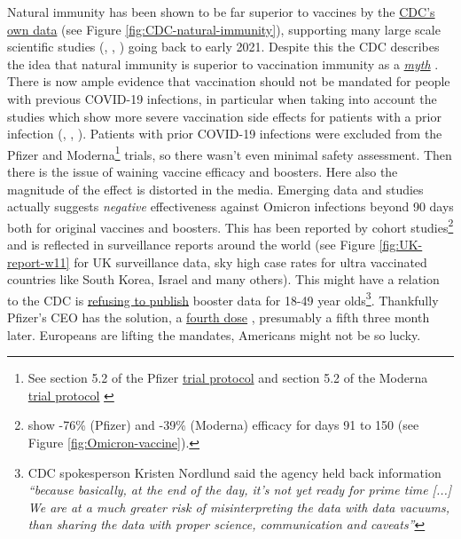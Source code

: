 \documentclass[11pt,a4paper,notitlepage]{report}
\begin{document}
Natural immunity has been shown to be far superior to vaccines by the \href{https://www.cdc.gov/mmwr/volumes/71/wr/mm7104e1.htm#F1_down}{CDC's own data} \cite{cdc28012020} (see Figure \ref{fig:CDC-natural-immunity}), supporting many large scale scientific studies (\cite{Gazit2021.08.24.21262415}, \cite{doi:10.1126/science.abf4063}, \cite{Goldberg2021.04.20.21255670}) going back to early 2021. Despite this the CDC describes the idea that natural immunity is superior to vaccination immunity as a \href{https://www.cdc.gov/coronavirus/2019-ncov/vaccines/facts.html}{\textit{myth}} \cite{cdc15122021} . There is now ample evidence that vaccination should not be mandated for people with previous COVID-19 infections, in particular when taking into account the studies which show more severe vaccination side effects for patients with a prior infection (\cite{Monforte2021}, \cite{LI20221082}, \cite{Raw22}). Patients with prior COVID-19 infections were excluded from the Pfizer and Moderna\footnote{See section 5.2 of the Pfizer \href{https://cdn.pfizer.com/pfizercom/2020-11/C4591001_Clinical_Protocol_Nov2020.pdf}{trial protocol} \cite{pfizer102020} and section 5.2 of the Moderna \href{https://www.modernatx.com/sites/default/files/mRNA-1273-P301-Protocol.pdf}{trial protocol} \cite{moderna102020}} trials, so there wasn't even minimal safety assessment. Then there is the issue of waining vaccine efficacy and boosters. Here also the magnitude of the effect is distorted in the media. Emerging data and studies actually suggests \textit{negative} effectiveness against Omicron infections beyond 90 days both for original vaccines and boosters. This has been reported by cohort studies\footnote{\citet{Hansen2021.12.20.21267966} show -76\% (Pfizer) and -39\% (Moderna) efficacy for days 91 to 150 (see Figure \ref{fig:Omicron-vaccine}).} and is reflected in surveillance reports around the world (see Figure \ref{fig:UK-report-w11} for UK surveillance data, sky high case rates for ultra vaccinated countries like South Korea, Israel and many others). This might have a relation to the CDC is \href{https://www.webmd.com/lung/news/20220222/report-cdc-not-publishing-large-amounts-of-covid-19-data}{refusing to publish} \cite{webmd22022022} booster data for 18-49 year olds\footnote{CDC spokesperson Kristen Nordlund said the agency held back information \textit{“because basically, at the end of the day, it’s not yet ready for prime time [...] We are at a much greater risk of misinterpreting the data with data vacuums, than sharing the data with proper science, communication and caveats”}}. Thankfully Pfizer's CEO has the solution, a \href{https://www.cbsnews.com/news/covid-vaccine-fourth-dose-booster-pfizer-ceo-albert-bourla/}{fourth dose} \cite{cbsnews14032022}, presumably a fifth three month later. Europeans are lifting the mandates, Americans might not be so lucky.
\end{document}
